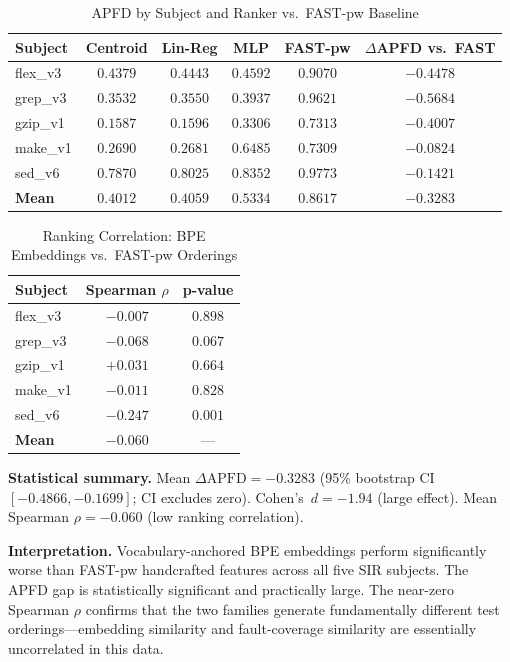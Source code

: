 \documentclass[10pt,conference]{IEEEtran}
\begin{document}
\begin{table}[htbp]
\centering
\caption{APFD by Subject and Ranker vs.\ FAST-pw Baseline}
\label{tab:apfd}
\begin{tabular}{@{} l c c c c c @{}}
\toprule
\textbf{Subject} & \textbf{Centroid} & \textbf{Lin-Reg} & \textbf{MLP} & \textbf{FAST-pw} & \textbf{$\Delta$APFD vs.\ FAST} \\
\midrule
flex\_v3 & $0.4379$ & $0.4443$ & $0.4592$ & $0.9070$ & $-0.4478$ \\
grep\_v3 & $0.3532$ & $0.3550$ & $0.3937$ & $0.9621$ & $-0.5684$ \\
gzip\_v1 & $0.1587$ & $0.1596$ & $0.3306$ & $0.7313$ & $-0.4007$ \\
make\_v1 & $0.2690$ & $0.2681$ & $0.6485$ & $0.7309$ & $-0.0824$ \\
sed\_v6 & $0.7870$ & $0.8025$ & $0.8352$ & $0.9773$ & $-0.1421$ \\
\midrule
\textbf{Mean} & $0.4012$ & $0.4059$ & $0.5334$ & $0.8617$ & \textbf{$-0.3283$} \\
\bottomrule
\end{tabular}
\end{table}

\begin{table}[htbp]
\centering
\caption{Ranking Correlation: BPE Embeddings vs.\ FAST-pw Orderings}
\label{tab:correlation}
\begin{tabular}{@{} l c c @{}}
\toprule
\textbf{Subject} & \textbf{Spearman $\rho$} & \textbf{p-value} \\
\midrule
flex\_v3 & $-0.007$ & $0.898$ \\
grep\_v3 & $-0.068$ & $0.067$ \\
gzip\_v1 & $+0.031$ & $0.664$ \\
make\_v1 & $-0.011$ & $0.828$ \\
sed\_v6 & $-0.247$ & $0.001$ \\
\midrule
\textbf{Mean} & \textbf{$-0.060$} & --- \\
\bottomrule
\end{tabular}
\end{table}

\textbf{Statistical summary.} Mean $\Delta\text{APFD} = -0.3283$ (95\% bootstrap CI $[-0.4866, -0.1699]$; CI excludes zero). Cohen's~$d = -1.94$ (large effect). Mean Spearman $\rho = -0.060$ (low ranking correlation).

\textbf{Interpretation.} Vocabulary-anchored BPE embeddings perform significantly worse than FAST-pw handcrafted features across all five SIR subjects. The APFD gap is statistically significant and practically large. The near-zero Spearman $\rho$ confirms that the two families generate fundamentally different test orderings---embedding similarity and fault-coverage similarity are essentially uncorrelated in this data.
\end{document}
